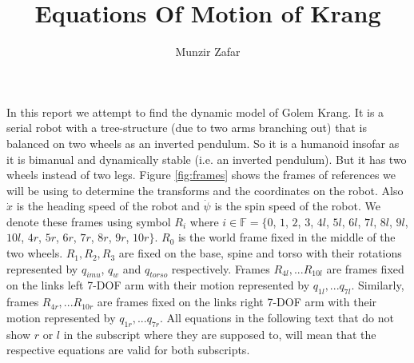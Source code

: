 \documentclass[a4paper,10pt]{article}
\title{Equations Of Motion of Krang}
\author{Munzir Zafar}
\begin{document}
\maketitle

In this report we attempt to find the dynamic model of Golem Krang. It is a serial robot with a tree-structure (due to two arms branching out) that is balanced on two wheels as an inverted pendulum. So it is a humanoid insofar as it is bimanual and dynamically stable (i.e. an inverted pendulum). But it has two wheels instead of two legs. Figure \ref{fig:frames} shows the frames of references we will be using to determine the transforms and the coordinates on the robot. Also $\dot{x}$ is the heading speed of the robot and $\dot\psi$ is the spin speed of the robot. We denote these frames using symbol $R_i$ where $i \in \mathbb{F} = \lbrace 0$, $1$, $2$, $3$, $4l$, $5l$, $6l$, $7l$, $8l$, $9l$, $10l$, $4r$, $5r$, $6r$, $7r$, $8r$, $9r$, $10r \rbrace$. $R_0$ is the world frame fixed in the middle of the two wheels. $R_1, R_2, R_3$ are fixed on the base, spine and torso with their rotations represented by $q_{imu}$, $q_w$ and $q_{torso}$ respectively. Frames $R_{4l}, ... R_{10l}$ are frames fixed on the links 
left 7-DOF arm with their motion represented by $q_{1l}, ... q_{7l}$. Similarly, frames $R_{4r}, ... R_{10r}$ are frames fixed on the links right 7-DOF arm with their motion represented by $q_{1r}, ... q_{7r}$.  All equations in the 
following text that do not show $r$ or $l$ in the subscript where they are supposed to, will mean that the respective equations are valid for both subscripts.
\end{document}
